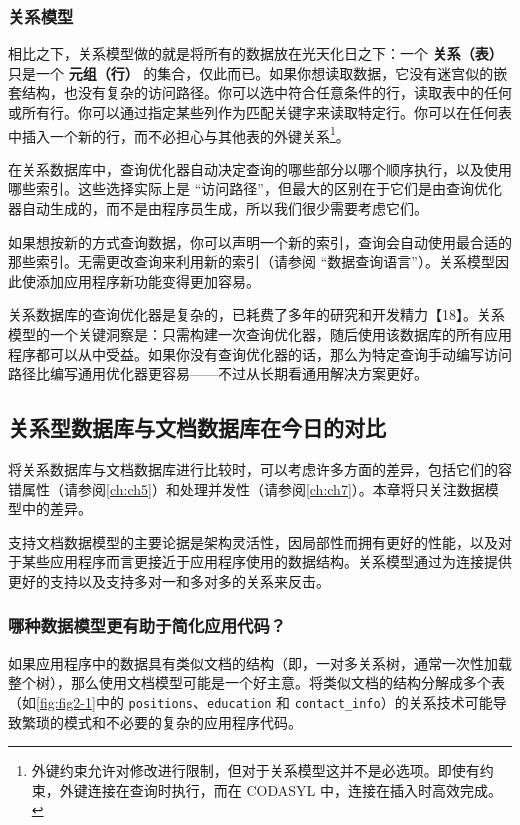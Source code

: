 \subsubsection{关系模型}

相比之下，关系模型做的就是将所有的数据放在光天化日之下：一个 \textbf{关系（表）} 只是一个 \textbf{元组（行）} 的集合，仅此而已。如果你想读取数据，它没有迷宫似的嵌套结构，也没有复杂的访问路径。你可以选中符合任意条件的行，读取表中的任何或所有行。你可以通过指定某些列作为匹配关键字来读取特定行。你可以在任何表中插入一个新的行，而不必担心与其他表的外键关系\footnote{外键约束允许对修改进行限制，但对于关系模型这并不是必选项。即使有约束，外键连接在查询时执行，而在 CODASYL 中，连接在插入时高效完成。}。

在关系数据库中，查询优化器自动决定查询的哪些部分以哪个顺序执行，以及使用哪些索引。这些选择实际上是 “访问路径”，但最大的区别在于它们是由查询优化器自动生成的，而不是由程序员生成，所以我们很少需要考虑它们。

如果想按新的方式查询数据，你可以声明一个新的索引，查询会自动使用最合适的那些索引。无需更改查询来利用新的索引（请参阅 “数据查询语言”）。关系模型因此使添加应用程序新功能变得更加容易。

关系数据库的查询优化器是复杂的，已耗费了多年的研究和开发精力【18】。关系模型的一个关键洞察是：只需构建一次查询优化器，随后使用该数据库的所有应用程序都可以从中受益。如果你没有查询优化器的话，那么为特定查询手动编写访问路径比编写通用优化器更容易——不过从长期看通用解决方案更好。

\subsection{关系型数据库与文档数据库在今日的对比}

将关系数据库与文档数据库进行比较时，可以考虑许多方面的差异，包括它们的容错属性（请参阅\autoref{ch:ch5}）和处理并发性（请参阅\autoref{ch:ch7}）。本章将只关注数据模型中的差异。

支持文档数据模型的主要论据是架构灵活性，因局部性而拥有更好的性能，以及对于某些应用程序而言更接近于应用程序使用的数据结构。关系模型通过为连接提供更好的支持以及支持多对一和多对多的关系来反击。

\subsubsection{哪种数据模型更有助于简化应用代码？}

如果应用程序中的数据具有类似文档的结构（即，一对多关系树，通常一次性加载整个树），那么使用文档模型可能是一个好主意。将类似文档的结构分解成多个表（如\autoref{fig:fig2-1}中的 \texttt{positions}、\texttt{education} 和 \texttt{contact\_info}）的关系技术可能导致繁琐的模式和不必要的复杂的应用程序代码。

